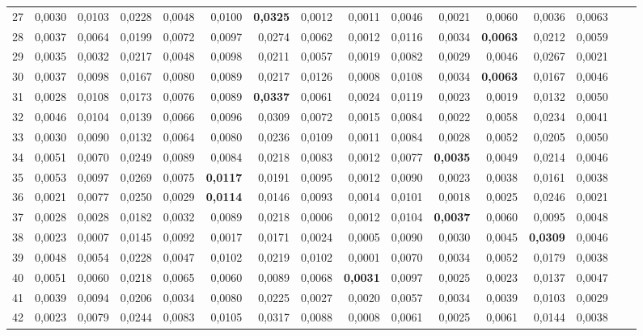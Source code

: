\begin{table}[htp!]
\begin{adjustwidth}{-1cm}{}
\begin{tabular}{ l | *{15}{| r}}
27	&	0,0030	&	0,0103	&	0,0228	&	0,0048	&	0,0100	&	\textbf{0,0325}	&	0,0012	&	0,0011	&	0,0046	&	0,0021	&	0,0060	&	0,0036	&	0,0063	\\
28	&	0,0037	&	0,0064	&	0,0199	&	0,0072	&	0,0097	&	0,0274	&	0,0062	&	0,0012	&	0,0116	&	0,0034	&	\textbf{0,0063}	&	0,0212	&	0,0059	\\
29	&	0,0035	&	0,0032	&	0,0217	&	0,0048	&	0,0098	&	0,0211	&	0,0057	&	0,0019	&	0,0082	&	0,0029	&	0,0046	&	0,0267	&	0,0021	\\
30	&	0,0037	&	0,0098	&	0,0167	&	0,0080	&	0,0089	&	0,0217	&	0,0126	&	0,0008	&	0,0108	&	0,0034	&	\textbf{0,0063}	&	0,0167	&	0,0046	\\
31	&	0,0028	&	0,0108	&	0,0173	&	0,0076	&	0,0089	&	\textbf{0,0337}	&	0,0061	&	0,0024	&	0,0119	&	0,0023	&	0,0019	&	0,0132	&	0,0050	\\
32	&	0,0046	&	0,0104	&	0,0139	&	0,0066	&	0,0096	&	0,0309	&	0,0072	&	0,0015	&	0,0084	&	0,0022	&	0,0058	&	0,0234	&	0,0041	\\
33	&	0,0030	&	0,0090	&	0,0132	&	0,0064	&	0,0080	&	0,0236	&	0,0109	&	0,0011	&	0,0084	&	0,0028	&	0,0052	&	0,0205	&	0,0050	\\
34	&	0,0051	&	0,0070	&	0,0249	&	0,0089	&	0,0084	&	0,0218	&	0,0083	&	0,0012	&	0,0077	&	\textbf{0,0035}	&	0,0049	&	0,0214	&	0,0046	\\
35	&	0,0053	&	0,0097	&	0,0269	&	0,0075	&	\textbf{0,0117}	&	0,0191	&	0,0095	&	0,0012	&	0,0090	&	0,0023	&	0,0038	&	0,0161	&	0,0038	\\
36	&	0,0021	&	0,0077	&	0,0250	&	0,0029	&	\textbf{0,0114}	&	0,0146	&	0,0093	&	0,0014	&	0,0101	&	0,0018	&	0,0025	&	0,0246	&	0,0021	\\
37	&	0,0028	&	0,0028	&	0,0182	&	0,0032	&	0,0089	&	0,0218	&	0,0006	&	0,0012	&	0,0104	&	\textbf{0,0037}	&	0,0060	&	0,0095	&	0,0048	\\
38	&	0,0023	&	0,0007	&	0,0145	&	0,0092	&	0,0017	&	0,0171	&	0,0024	&	0,0005	&	0,0090	&	0,0030	&	0,0045	&	\textbf{0,0309}	&	0,0046	\\
39	&	0,0048	&	0,0054	&	0,0228	&	0,0047	&	0,0102	&	0,0219	&	0,0102	&	0,0001	&	0,0070	&	0,0034	&	0,0052	&	0,0179	&	0,0038	\\
40	&	0,0051	&	0,0060	&	0,0218	&	0,0065	&	0,0060	&	0,0089	&	0,0068	&	\textbf{0,0031}	&	0,0097	&	0,0025	&	0,0023	&	0,0137	&	0,0047	\\
41	&	0,0039	&	0,0094	&	0,0206	&	0,0034	&	0,0080	&	0,0225	&	0,0027	&	0,0020	&	0,0057	&	0,0034	&	0,0039	&	0,0103	&	0,0029	\\
42	&	0,0023	&	0,0079	&	0,0244	&	0,0083	&	0,0105	&	0,0317	&	0,0088	&	0,0008	&	0,0061	&	0,0025	&	0,0061	&	0,0144	&	0,0038	\\

\end{tabular}
\end{adjustwidth}
\end{table}
